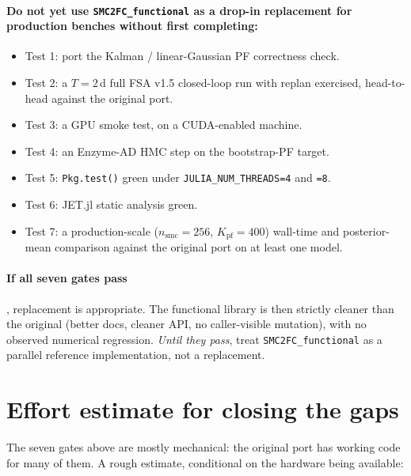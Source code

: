 \documentclass[11pt,a4paper]{article}
\begin{document}
\paragraph{Do not yet use \texttt{SMC2FC\_functional} as a drop-in
replacement for production benches without first completing:}
\begin{itemize}[leftmargin=*]
\item Test 1: port the Kalman / linear-Gaussian PF correctness check.
\item Test 2: a $T{=}2$\,d full FSA v1.5 closed-loop run with replan
exercised, head-to-head against the original port.
\item Test 3: a GPU smoke test, on a CUDA-enabled machine.
\item Test 4: an Enzyme-AD HMC step on the bootstrap-PF target.
\item Test 5: \texttt{Pkg.test()} green under
\texttt{JULIA\_NUM\_THREADS=4} and \texttt{=8}.
\item Test 6: JET.jl static analysis green.
\item Test 7: a production-scale ($n_{\mathrm{smc}}{=}256$,
$K_{\mathrm{pf}}{=}400$) wall-time and posterior-mean comparison
against the original port on at least one model.
\end{itemize}

\paragraph{If all seven gates pass}, replacement is appropriate. The
functional library is then strictly cleaner than the original (better
docs, cleaner API, no caller-visible mutation), with no observed
numerical regression. \emph{Until they pass}, treat
\texttt{SMC2FC\_functional} as a parallel reference implementation, not a
replacement.

\section{Effort estimate for closing the gaps}
The seven gates above are mostly mechanical: the original port has
working code for many of them. A rough estimate, conditional on the
hardware being available:
\end{document}
